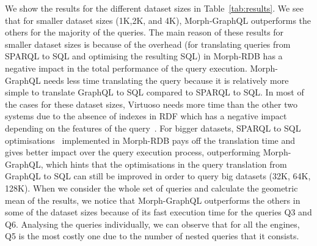 We show the results for the different dataset sizes in Table~\ref{tab:results}. We see that for smaller dataset sizes (1K,2K, and 4K), Morph-GraphQL outperforms the others for the majority of the queries. The main reason of these results for smaller dataset sizes is because of the overhead (for translating queries from SPARQL to SQL and optimising the resulting SQL) in Morph-RDB has a negative impact in the total performance of the query execution. Morph-GraphQL needs less time translating the query because it is relatively more simple to translate GraphQL to SQL compared to SPARQL to SQL. In most of the cases for these dataset sizes, Virtuoso needs more time than the other two systems due to the absence of indexes in RDF which has a negative impact depending on the features of the query~\citep{endris2019ontario}. For bigger datasets, SPARQL to SQL optimisations~\citep{priyatna2014formalisation} implemented in Morph-RDB pays off the translation time and gives better impact over the query execution process, outperforming Morph-GraphQL, which hints that the optimisations in the query translation from GraphQL to SQL can still be improved in order to query big datasets (32K, 64K, 128K). When we consider the whole set of queries and calculate the geometric mean of the results, we notice that Morph-GraphQL outperforms the others in some of the dataset sizes because of its fast execution time for the queries Q3 and Q6. Analysing the queries individually, we can observe that for all the engines, Q5 is the most costly one due to the number of nested queries that it consists. 
